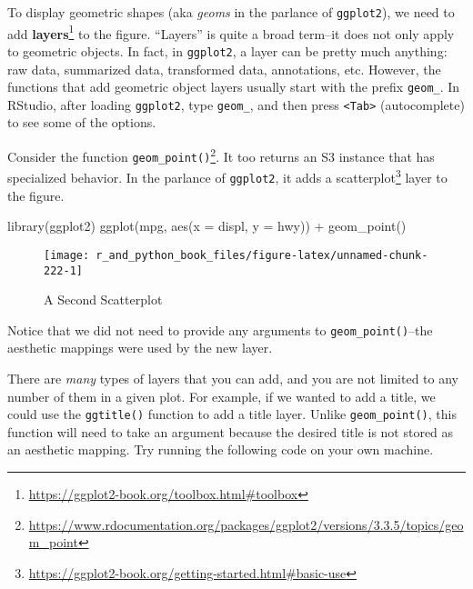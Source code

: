 \documentclass[
  12pt,
  krantz2]{krantz}
\makeatletter
\newenvironment{Shaded}{\begin{snugshade}}{\end{snugshade}}
\newcommand{\AttributeTok}[1]{\textcolor[rgb]{0.61,0.61,0.61}{#1}}
\newcommand{\FunctionTok}[1]{\textcolor[rgb]{0,0,0}{#1}}
\newcommand{\NormalTok}[1]{#1}
\newcommand{\SpecialCharTok}[1]{\textcolor[rgb]{0,0,0}{#1}}
\renewcommand{\href}[2]{#2\footnote{\url{#1}}}
\newenvironment{kframe}{%
\medskip{}
\setlength{\fboxsep}{.8em}
 \def\at@end@of@kframe{}%
 \ifinner\ifhmode%
  \def\at@end@of@kframe{\end{minipage}}%
  \begin{minipage}{\columnwidth}%
 \fi\fi%
 \def\FrameCommand##1{\hskip\@totalleftmargin \hskip-\fboxsep
 \colorbox{shadecolor}{##1}\hskip-\fboxsep
     \hskip-\linewidth \hskip-\@totalleftmargin \hskip\columnwidth}%
 \MakeFramed {\advance\hsize-\width
   \@totalleftmargin\z@ \linewidth\hsize
   \@setminipage}}%
 {\par\unskip\endMakeFramed%
 \at@end@of@kframe}
\renewenvironment{Shaded}{\begin{kframe}}{\end{kframe}}
\makeatother
\begin{document}
To display geometric shapes (aka \emph{geoms} in the parlance of \texttt{ggplot2}), we need to add \href{https://ggplot2-book.org/toolbox.html\#toolbox}{\textbf{layers}} to the figure. ``Layers'' is quite a broad term--it does not only apply to geometric objects. In fact, in \texttt{ggplot2}, a layer can be pretty much anything: raw data, summarized data, transformed data, annotations, etc. However, the functions that add geometric object layers usually start with the prefix \texttt{geom\_}. In RStudio, after loading \texttt{ggplot2}, type \texttt{geom\_}, and then press \texttt{\textless{}Tab\textgreater{}} (autocomplete) to see some of the options.

Consider the function \href{https://www.rdocumentation.org/packages/ggplot2/versions/3.3.5/topics/geom_point}{\texttt{geom\_point()}}. It too returns an S3 instance that has specialized behavior. In the parlance of \texttt{ggplot2}, it adds a \href{https://ggplot2-book.org/getting-started.html\#basic-use}{scatterplot} layer to the figure.

\begin{Shaded}
\begin{Highlighting}[]
\FunctionTok{library}\NormalTok{(ggplot2)}
\FunctionTok{ggplot}\NormalTok{(mpg, }\FunctionTok{aes}\NormalTok{(}\AttributeTok{x =}\NormalTok{ displ, }\AttributeTok{y =}\NormalTok{ hwy))  }\SpecialCharTok{+}
  \FunctionTok{geom\_point}\NormalTok{()}
\end{Highlighting}
\end{Shaded}

\begin{figure}

{\centering \texttt{[image: r\_and\_python\_book\_files/figure-latex/unnamed-chunk-222-1]} 

}

\caption{A Second Scatterplot}\label{fig:unnamed-chunk-222}
\end{figure}

Notice that we did not need to provide any arguments to \texttt{geom\_point()}--the aesthetic mappings were used by the new layer.

There are \emph{many} types of layers that you can add, and you are not limited to any number of them in a given plot. For example, if we wanted to add a title, we could use the \texttt{ggtitle()} function to add a title layer. Unlike \texttt{geom\_point()}, this function will need to take an argument because the desired title is not stored as an aesthetic mapping. Try running the following code on your own machine.
\end{document}
